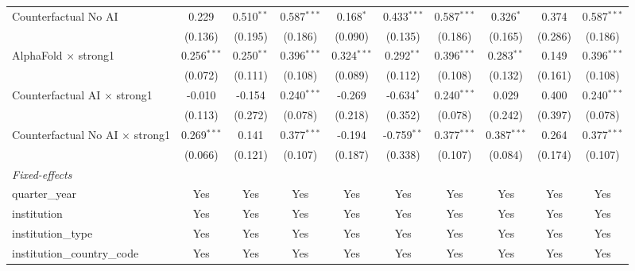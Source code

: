 \begin{tabular}{lccccccccc}
   Counterfactual No AI                   & 0.229         & 0.510$^{**}$ & 0.587$^{***}$ & 0.168$^{*}$   & 0.433$^{***}$ & 0.587$^{***}$ & 0.326$^{*}$   & 0.374   & 0.587$^{***}$\\   
                                          & (0.136)       & (0.195)      & (0.186)       & (0.090)       & (0.135)       & (0.186)       & (0.165)       & (0.286) & (0.186)\\   
   AlphaFold $\times$ strong1             & 0.256$^{***}$ & 0.250$^{**}$ & 0.396$^{***}$ & 0.324$^{***}$ & 0.292$^{**}$  & 0.396$^{***}$ & 0.283$^{**}$  & 0.149   & 0.396$^{***}$\\   
                                          & (0.072)       & (0.111)      & (0.108)       & (0.089)       & (0.112)       & (0.108)       & (0.132)       & (0.161) & (0.108)\\   
   Counterfactual AI $\times$ strong1     & -0.010        & -0.154       & 0.240$^{***}$ & -0.269        & -0.634$^{*}$  & 0.240$^{***}$ & 0.029         & 0.400   & 0.240$^{***}$\\   
                                          & (0.113)       & (0.272)      & (0.078)       & (0.218)       & (0.352)       & (0.078)       & (0.242)       & (0.397) & (0.078)\\   
   Counterfactual No AI $\times$ strong1  & 0.269$^{***}$ & 0.141        & 0.377$^{***}$ & -0.194        & -0.759$^{**}$ & 0.377$^{***}$ & 0.387$^{***}$ & 0.264   & 0.377$^{***}$\\   
                                          & (0.066)       & (0.121)      & (0.107)       & (0.187)       & (0.338)       & (0.107)       & (0.084)       & (0.174) & (0.107)\\   
   \midrule
   \emph{Fixed-effects}\\
   quarter\_year                          & Yes           & Yes          & Yes           & Yes           & Yes           & Yes           & Yes           & Yes     & Yes\\  
   institution                            & Yes           & Yes          & Yes           & Yes           & Yes           & Yes           & Yes           & Yes     & Yes\\  
   institution\_type                      & Yes           & Yes          & Yes           & Yes           & Yes           & Yes           & Yes           & Yes     & Yes\\  
   institution\_country\_code             & Yes           & Yes          & Yes           & Yes           & Yes           & Yes           & Yes           & Yes     & Yes\\  

\end{tabular}
